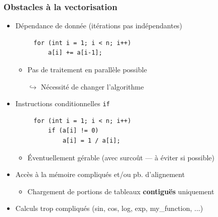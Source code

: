 \documentclass[xcolor={x11names,svgnames}]{beamer}
\begin{document}
\begin{frame}[fragile=singleslide]
  \frametitle{Obstacles à la vectorisation}

  \begin{itemize}
  \item Dépendance de donnée (itérations pas indépendantes)
     \begin{verbatim}
     for (int i = 1; i < n; i++)
         a[i] += a[i-1];
\end{verbatim}
    \begin{itemize}
    \item Pas de traitement en parallèle possible
      \item[$\hookrightarrow$] Nécessité de changer l'algorithme
    \end{itemize}

\medskip

\item Instructions conditionnelles \texttt{if}
     \begin{verbatim}
     for (int i = 1; i < n; i++)
         if (a[i] != 0)
             a[i] = 1 / a[i];
\end{verbatim}
  \begin{itemize}
  \item Éventuellement gérable (avec surcoût --- à éviter si possible)
  \end{itemize}

  \medskip

\item Accès à la mémoire compliqués et/ou pb. d'alignement
  \begin{itemize}
  \item Chargement de portions de tableaux \textbf{contiguës} uniquement 
  \end{itemize}
  
  \medskip

\item Calculs trop compliqués (sin, cos, log, exp, my\_function, ...)
\end{itemize}
\end{frame}  

\end{document}
